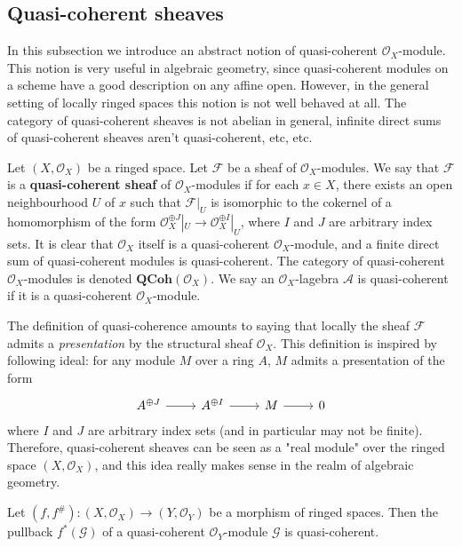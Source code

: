 \subsection{Quasi-coherent sheaves}
In this subsection we introduce an abstract notion of quasi-coherent $\mathscr{O}_X$-module. This notion is very useful in algebraic geometry, since quasi-coherent modules on a scheme have a good description on any affine open. However, in the general setting of locally ringed spaces this notion is not well behaved at all. The category of quasi-coherent sheaves is not abelian in general, infinite direct sums of quasi-coherent sheaves aren't quasi-coherent, etc, etc.\par
Let $(X,\mathscr{O}_X)$ be a ringed space. Let $\mathscr{F}$ be a sheaf of $\mathscr{O}_X$-modules. We say that $\mathscr{F}$ is a \textbf{quasi-coherent sheaf} of $\mathscr{O}_X$-modules if for each $x\in X$, there exists an open neighbourhood $U$ of $x$ such that $\mathscr{F}|_U$ is isomorphic to the cokernel of a homomorphism of the form $\mathscr{O}_X^{\oplus J}|_U\to\mathscr{O}_X^{\oplus I}|_U$, where $I$ and $J$ are arbitrary index sets. It is clear that $\mathscr{O}_X$ itself is a quasi-coherent $\mathscr{O}_X$-module, and a finite direct sum of quasi-coherent modules is quasi-coherent. The category of quasi-coherent $\mathscr{O}_X$-modules is denoted $\mathbf{QCoh}(\mathscr{O}_X)$. We say an $\mathscr{O}_X$-lagebra $\mathscr{A}$ is quasi-coherent if it is a quasi-coherent $\mathscr{O}_X$-module.\par
The definition of quasi-coherence amounts to saying that locally the sheaf $\mathscr{F}$ admits a \textit{presentation} by the structural sheaf $\mathscr{O}_X$. This definition is inspired by following ideal: for any module $M$ over a ring $A$, $M$ admits a presentation of the form
\[\begin{tikzcd}
A^{\oplus J}\ar[r]&A^{\oplus I}\ar[r]&M\ar[r]&0
\end{tikzcd}\]
where $I$ and $J$ are arbitrary index sets (and in particular may not be finite). Therefore, quasi-coherent sheaves can be seen as a "real module" over the ringed space $(X,\mathscr{O}_X)$, and this idea really makes sense in the realm of algebraic geometry.
\begin{proposition}\label{sheaf of module qcoh under inverse image}
Let $(f,f^{\#}):(X,\mathscr{O}_X)\to(Y,\mathscr{O}_Y)$ be a morphism of ringed spaces. Then the pullback $f^*(\mathscr{G})$ of a quasi-coherent $\mathscr{O}_Y$-module $\mathscr{G}$ is quasi-coherent.
\end{proposition}
